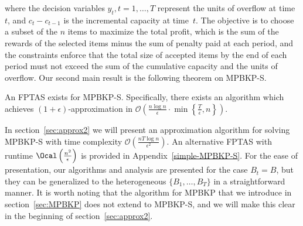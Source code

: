 \documentclass[11pt]{article}
\begin{document}
where the  decision variables $y_t, t=1,\ldots, T$ represent the units of overflow at time~$t$, and {  $c_t-c_{t-1}$} is the incremental capacity at time~$t$. The objective is to choose a subset of the $n$ items to maximize the total profit, which is the sum of the rewards of the selected items  minus the sum of penalty paid at each period, and the constraints enforce that the total size of accepted items by the end of each period must not exceed the sum of the cumulative capacity and the units of overflow. Our second main result is the following theorem on MPBKP-S.
\begin{theorem}\label{mainthm2}
	An FPTAS exists for MPBKP-S. Specifically, there exists an algorithm which achieves $(1+\epsilon)$-approximation in  ${\mathcal{O}}\left(\frac{n\log n}{\epsilon}\cdot \min\left\{\frac{T}{\epsilon}, n\right\}\right)$.
\end{theorem}

In section~\ref{sec:approx2} we will present an approximation algorithm for solving MPBKP-S with time complexity $\mathcal{O}\left(\frac{nT\log n}{\epsilon^2}\right)$. An alternative FPTAS with runtime $\Ocal\left(\frac{n^2}{\epsilon}\right)$ is provided in Appendix~\ref{simple-MPBKP-S}. 
For the ease of presentation, our algorithms and analysis are presented for the case $B_t=B$, but they can be generalized to the heterogeneous $\{B_1,\ldots,B_T\}$ in a straightforward manner. It is worth noting that the algorithm for MPBKP that we introduce in section~\ref{sec:MPBKP} does not extend to MPBKP-S, and we will make this clear in the beginning of section~\ref{sec:approx2}.
\end{document}
